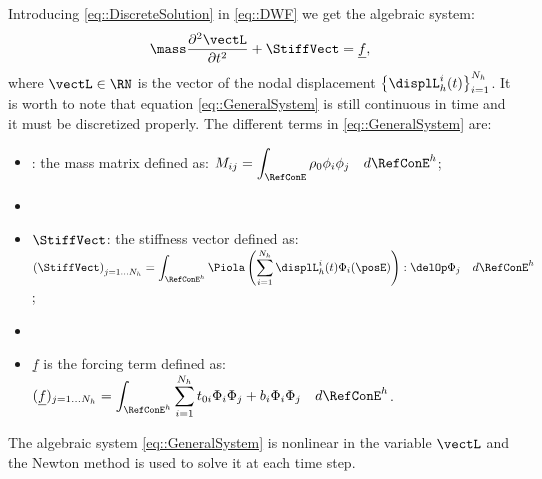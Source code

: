 Introducing \eqref{eq::DiscreteSolution} in \eqref{eq::DWF} we get the algebraic system:
\begin{equation}
  \mass\frac{\partial^2\vectL}{\partial t^2}+\StiffVect = \underline{f},
  \label{eq::GeneralSystem}
\end{equation}
where $\vectL \in \RN$ is the vector of the nodal displacement $\left\{\displL_h^i(t)\right\}_{i=1}^{N_h}$. It is worth to note that equation \eqref{eq::GeneralSystem} is still continuous in time and it must be discretized properly. The different terms in \eqref{eq::GeneralSystem} are:
\begin{itemize}
  \item \mass: the mass matrix defined as: $\displaystyle M_{ij}=\int_{\RefConE}\rho_0\phi_i\phi_j\quad d\RefConE^h$;
  \item[]
  \item $\StiffVect$: the stiffness vector defined as: $\displaystyle \left(\StiffVect\right)_{j=1\ldots N_h}=\int_{\RefConE^h}\Piola\left(\sum_{i=1}^{N_h}\displL_h^i(t)\Phi_i(\posE)\right):\delOp\Phi_j\quad d \RefConE^h$;
  \item[]
  \item $\underline{f}$ is the forcing term defined as: $\displaystyle (\underline{f})_{j=1\ldots N_h}=\int_{\RefConE^h}\sum_{i=1}^{N_h}t_{0i}\Phi_i\Phi_j+b_i\Phi_i\Phi_j\quad d\RefConE^h$.
\end{itemize}
The algebraic system \eqref{eq::GeneralSystem} is nonlinear in the variable $\vectL$ and the Newton method is used to solve it at each time step.

